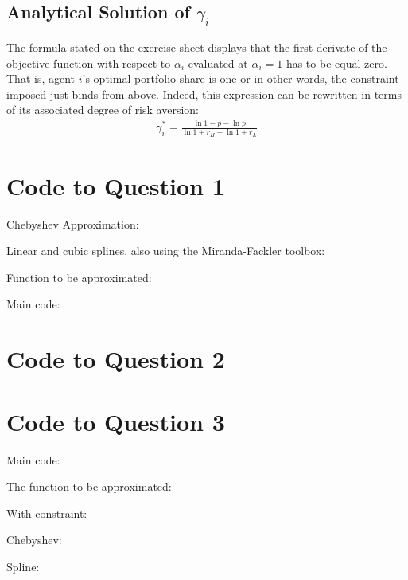 \documentclass{article}
\begin{document}
\subsection{Analytical Solution of $\gamma_i$}
The formula stated on the exercise sheet  displays that the first derivate of the objective function with respect to $\alpha_i$ evaluated at $\alpha_i=1$ has to be equal zero. That is, agent $i$'s optimal portfolio share is one or in other words, the constraint imposed just binds from above. Indeed, this expression can be rewritten in terms of its associated degree of risk aversion: \begin{align*}
\gamma_i^*=\frac{\ln{1-p}-\ln{p}}{\ln {1+r_H}-\ln {1+r_L}}
\end{align*}
\newpage
\begin{appendices}
\section{Code to Question 1}
Chebyshev Approximation:

Linear and cubic splines, also using the Miranda-Fackler toolbox:

Function to be approximated:

Main code:

\section{Code to Question 2}

\section{Code to Question 3}
Main code:

The function to be approximated:

With constraint:

Chebyshev:

Spline:

\end{appendices}
\end{document}

